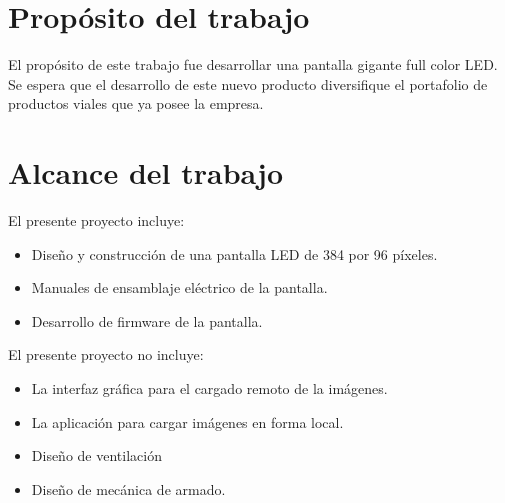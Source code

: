 \section{Propósito del trabajo}
El propósito de este trabajo fue desarrollar una pantalla gigante full color LED. Se espera que el desarrollo de este nuevo producto diversifique el portafolio de productos viales que ya posee la empresa.
\section{Alcance del trabajo}
El presente proyecto incluye:

\begin{itemize}
\item Diseño y construcción de una pantalla LED de 384 por 96 píxeles.
\item Manuales de ensamblaje eléctrico de la pantalla.
\item Desarrollo de firmware de la pantalla.


\end{itemize}

El presente proyecto no incluye:

 \begin{itemize}
\item La interfaz gráfica para el cargado remoto de la imágenes.
\item La aplicación para cargar imágenes en forma local.
\item Diseño de ventilación 
\item Diseño de mecánica de armado.

\end{itemize}




